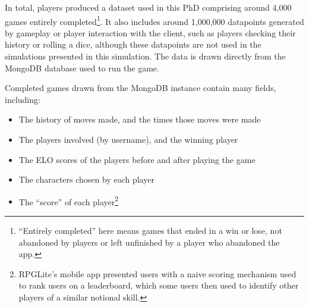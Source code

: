 In total, players produced a dataset used in this PhD comprising around 4,000
games entirely
completed\footnote{``Entirely completed'' here means games that ended in a win
or lose, not abandoned by players or left unfinished by a player who abandoned
the app.}. It also includes around 1,000,000 datapoints generated by gameplay or
player interaction with the client, such as players checking their history or
rolling a dice, although these datapoints are not used in the simulations
presented in this simulation. The data is drawn directly from the MongoDB
database used to run the game.

Completed games drawn from the MongoDB instance contain many fields, including: 

\begin{itemize}
    \item The history of moves made, and the times those moves were made
    \item The players involved (by username), and the winning player
    \item The ELO scores of the players before and after playing the game
    \item The characters chosen by each player
    \item The ``score'' of each player\footnote{RPGLite's mobile app presented
    users with a naive scoring mechanism used to rank users on a leaderboard,
    which some users then used to identify other players of a similar notional
    skill.}
\end{itemize}




